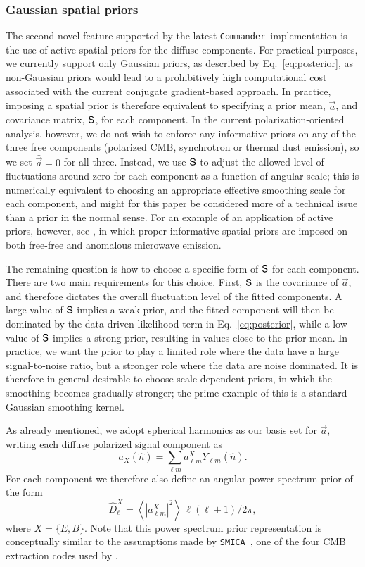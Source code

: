 \documentclass[twocolumn]{aa}
\def\commander{\texttt{Commander}}
\def\smica{\texttt{SMICA}}
\renewcommand{\a}[0]{\vec{a}}
\renewcommand{\S}[0]{\tens{S}}
\newcommand{\?}[1]{\textcolor{red}{{\bf [#1]}}}
\begin{document}
\subsubsection{Gaussian spatial priors}
\label{sec:priors}

The second novel feature supported by the latest \commander\ implementation is
the use of active spatial priors for the diffuse components. For practical
purposes, we currently support only Gaussian priors, as described by
Eq.~\eqref{eq:posterior}, as non-Gaussian priors would lead to a prohibitively
high computational cost associated with the current conjugate gradient-based approach. In
practice, imposing a spatial prior is therefore equivalent to specifying a prior
mean, $\bar{\a}$, and covariance matrix, $\S$, for each component. In the current
polarization-oriented analysis, however, we do not wish to enforce any
informative priors on any of the three free components
(polarized CMB, synchrotron or thermal dust emission), so we set
$\bar{\a}=0$ for all three. Instead, we use $\S$ to adjust the allowed
level of fluctuations around zero for each component as a function of angular
scale; this is numerically equivalent to choosing an appropriate effective
smoothing scale for each component, and might for this paper be considered more of a technical
issue than a prior in the normal sense. For an example of an application of
active priors, however, see \citet{bp13}, in which proper informative spatial
priors are imposed on both free-free and anomalous microwave emission.

The remaining question is how to choose a specific form of $\S$ for each
component. There are two main requirements for this choice. First, $\S$ is the
covariance of $\a$, and therefore dictates the overall fluctuation level of the
fitted components. A large value of $\S$ implies a weak prior, and the fitted
component will then be dominated by the data-driven likelihood term in
Eq.~\eqref{eq:posterior}, while a low value of $\S$ implies a strong prior,
resulting in values close to the prior mean. In practice, we want the prior to
play a limited role where the data have a large signal-to-noise ratio, but a
stronger role where the data are noise dominated. It is therefore in general
desirable to choose scale-dependent priors, in which the smoothing becomes
gradually stronger; the prime example of this is a standard Gaussian smoothing
kernel.

As already mentioned, we adopt spherical harmonics as our basis set
for $\a$, writing each diffuse polarized signal component as
\begin{equation}
a_{X}(\hat{n}) = \sum_{\ell m} a^{X}_{\ell m} Y_{\ell m}(\hat{n}).
\end{equation}
For each component we therefore also define an angular power spectrum prior of the form
\begin{equation}
  \hat{D}^{X}_{\ell} = \left<|a^{X}_{\ell m}|^2\right> \,\ell(\ell+1)/2\pi,
\end{equation} 
where $X=\{E,B\}$. Note that this power spectrum
prior representation is conceptually similar to the assumptions made by \smica\
\citep{cardoso2008}, one of the four CMB extraction codes used by \Planck.
\end{document}

